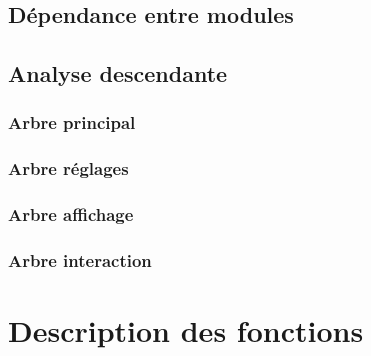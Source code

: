 \documentclass[a4paper,11pt]{article}
\begin{document}
\newpage

\subsection{Dépendance entre modules}

\subsection{Analyse descendante}

\subsubsection{Arbre principal}
    	
\begin{alltt}

\end{alltt}

\subsubsection{Arbre réglages}

\begin{alltt}

\end{alltt}

\subsubsection{Arbre affichage}

\begin{alltt}

\end{alltt}
\subsubsection{Arbre interaction}

\begin{alltt}
	
\end{alltt}
\newpage
\section{Description des fonctions}
\end{document}
